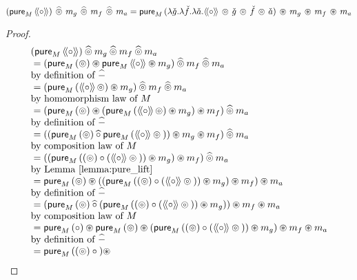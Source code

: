 \documentclass{article}
\newenvironment{lemma}[1]{%
  \renewcommand\thelemmainner{#1}%
  \lemmainner
}{\endlemmainner}
\begin{document}
\begin{lemma}{16}\label{lemma:ppair}
$$
(\apure_M\,\ppair{\comp})\, \alift{\pappl}\, m_g\, \alift{\pappl}\, m_f\, \alift{\pappl}\, m_a
= \apure_M\,(\lambda \pstr{g}. \lambda \pstr{f}. \lambda \pstr{a}. \ppair{\comp}\, \pappl\, \pstr{g} \, \pappl\, \pstr{f} \, \pappl\, \pstr{a})\, \appl\, m_g\, \appl\, m_f\, \appl\, m_a 
$$
\end{lemma}
\begin{proof}
$$
\begin{array}{ll}
(\apure_M\,\ppair{\comp}) \alift{\pappl} m_g \alift{\pappl} m_f \alift{\pappl} m_a\\
{}=
(\apure_M\,(\pappl) \appl \apure_M\,\ppair{\comp} \appl m_g) \alift{\pappl} m_f \alift{\pappl} m_a\\
\mbox{by definition of }\alift{-}\\
{}= (\apure_M\,(\ppair{\comp}\, \pappl) \appl m_g) \alift{\pappl} m_f \alift{\pappl} m_a\\
 \mbox{by homomorphism law of }M\\
{}= (\apure_M\,(\pappl) \appl (\apure_M\,(\ppair{\comp}\, \pappl) \appl m_g) \appl m_f) \alift{\pappl} m_a\\
\mbox{by definition of }\alift{-}\\
{}= (
       (\apure_M\,(\pappl) \alift{\comp} \apure_M\,(\ppair{\comp} \pappl {}))
       \appl m_g
     \appl m_f) \alift{\pappl} m_a\\
\mbox{by composition law of }M\\
{}= ((
       \apure_M\,((\pappl) \comp (\ppair{\comp} \pappl {}))
       \appl m_g
     ) \appl m_f) \alift{\pappl} m_a\\
\mbox{by Lemma \ref{lemma:pure_lift}}\\
{}= \apure_M\,(\pappl) \appl
    ((
       \apure_M\,((\pappl) \comp (\ppair{\comp} \pappl {}))
       \appl m_g
     ) \appl m_f) \appl m_a\\
\mbox{by definition of }\alift{-}\\
{}= (\apure_M\,(\pappl) \alift{\comp}
     (\apure_M\,((\pappl) \comp (\ppair{\comp} \pappl {}))
       \appl m_g))
    \appl m_f \appl m_a\\
\mbox{by composition law of }M\\
{}= \apure_M\,(\comp) \appl
     \apure_M\,(\pappl) \appl
     (\apure_M\,((\pappl) \comp (\ppair{\comp} \pappl {}))
       \appl m_g)
    \appl m_f \appl m_a\\
\mbox{by definition of }\alift{-}\\
{}= \apure_M\,((\pappl) \comp {}) \appl

\end{array}$$
\end{proof}
\end{document}
